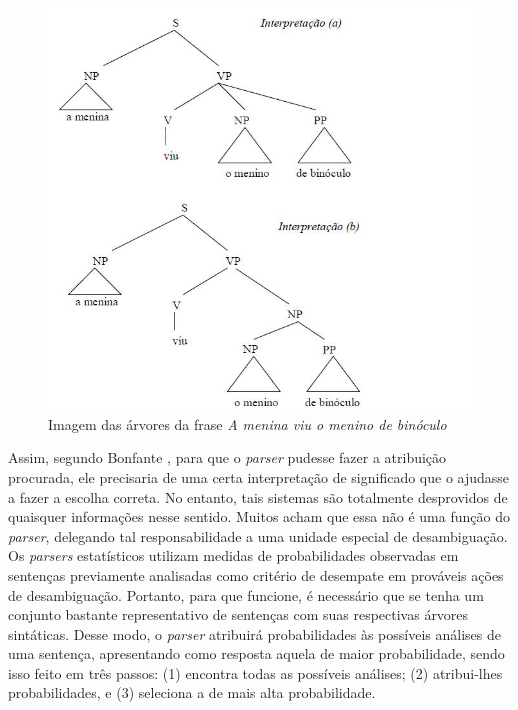 \begin{figure}
	\begin{center}
		\includegraphics[scale=0.5]{ambig.jpg}
		\caption{\label{ambiguidade} Imagem das árvores da frase \emph{A menina viu o menino de binóculo}}		
	\end{center}
\end{figure}

Assim, segundo Bonfante \cite{bonfante03}, para que o \emph{parser} pudesse fazer a atribuição procurada, ele precisaria de uma certa interpretação de significado que o ajudasse a fazer a escolha correta. No entanto, tais sistemas são totalmente desprovidos de quaisquer informações nesse sentido. Muitos acham que essa não é uma função do \emph{parser}, delegando tal responsabilidade a uma unidade especial de desambiguação. Os \emph{parsers} estatísticos utilizam medidas de probabilidades observadas em sentenças previamente analisadas como critério de desempate em prováveis ações de desambiguação. Portanto, para que funcione, é necessário que se tenha um conjunto bastante representativo de sentenças com suas respectivas árvores sintáticas. Desse modo, o \emph{parser} atribuirá probabilidades às possíveis análises de uma sentença, apresentando como resposta aquela de maior probabilidade, sendo isso feito em três passos: (1) encontra todas as possíveis análises; (2) atribui-lhes probabilidades, e (3) seleciona a de mais alta probabilidade.


